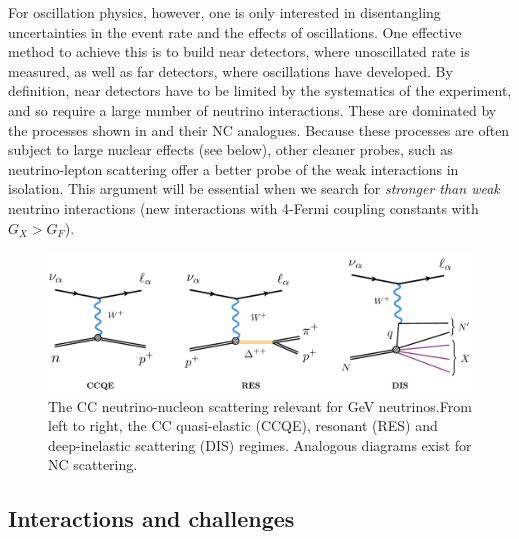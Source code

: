 For oscillation physics, however, one is only interested in disentangling uncertainties in the event rate and the effects of oscillations. One effective method to achieve this is to build near detectors, where unoscillated rate is measured, as well as far detectors, where oscillations have developed. By definition, near detectors have to be limited by the systematics of the experiment, and so require a large number of neutrino interactions. These are dominated by the processes shown in  and their NC analogues. Because these processes are often subject to large nuclear effects (see below), other cleaner probes, such as neutrino-lepton scattering offer a better probe of the weak interactions in isolation. This argument will be essential when we search for \emph{stronger than weak} neutrino interactions (new interactions with 4-Fermi coupling constants with $G_X > G_F$). 
%
\begin{figure}[t]
\centering
\includegraphics[width=\textwidth]{interactions.pdf}
  \caption[Neutrino nucleon interactions.]{The CC neutrino-nucleon scattering relevant for GeV neutrinos.From left to right, the CC quasi-elastic (CCQE), resonant (RES) and deep-inelastic scattering (DIS) regimes. Analogous diagrams exist for NC scattering. \label{fig:interactions_diagram}}
\end{figure}
%

\subsection{Interactions and challenges}

